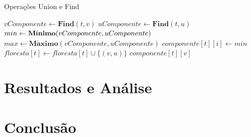\documentclass[12pt]{article}
\begin{document}
\begin{algorithm}
    \DontPrintSemicolon
    \caption{Operações Union e Find}
    {
        $vComponente \gets  \textbf{Find}(t,v)$\;
        $uComponente \gets  \textbf{Find}(t,u)$\;
        $min\gets\textbf{M}\acute{\textbf{\i}}\textbf{nimo}(vComponente,uComponente)$\;
		$max\gets\textbf{M}\acute{\textbf{a}}\textbf{ximo}(vComponente,uComponente)$\;
        {
            {
                {
                    $componente[t][i] \gets min$\;
                }
            }
            $floresta[t] \gets floresta[t] \cup \{(v,u)\}$\;
        }
    }
    {
        \Return $componente[t][v]$\;
    }
\end{algorithm}

{\color{gray}\lipsum[1]}

\section{Resultados e Análise}

{\color{gray}\lipsum[1]}

\section{Conclusão}

{\color{gray}\lipsum[1]}
\end{document}
